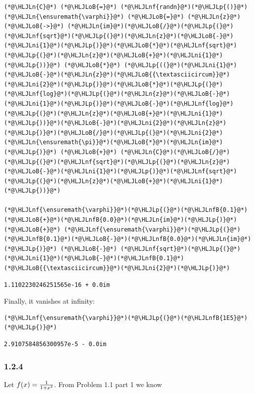 \documentclass[12pt,a4paper]{article}
\newcommand{\HLJLn}[1]{#1}
\newcommand{\HLJLnf}[1]{\textcolor[RGB]{66,102,213}{#1}}
\newcommand{\HLJLnfB}[1]{\textcolor[RGB]{59,151,46}{#1}}
\newcommand{\HLJLni}[1]{\textcolor[RGB]{59,151,46}{#1}}
\newcommand{\HLJLoB}[1]{\textcolor[RGB]{102,102,102}{\textbf{#1}}}
\newcommand{\HLJLp}[1]{#1}
\begin{document}
\begin{lstlisting}
(*@\HLJLn{C}@*) (*@\HLJLoB{=}@*) (*@\HLJLnf{randn}@*)(*@\HLJLp{()}@*)
(*@\HLJLn{\ensuremath{\varphi}}@*) (*@\HLJLoB{=}@*) (*@\HLJLn{z}@*) (*@\HLJLoB{->}@*) (*@\HLJLn{im}@*)(*@\HLJLoB{/}@*)(*@\HLJLp{(}@*)(*@\HLJLnf{sqrt}@*)(*@\HLJLp{(}@*)(*@\HLJLn{z}@*)(*@\HLJLoB{-}@*)(*@\HLJLni{1}@*)(*@\HLJLp{)}@*)(*@\HLJLoB{*}@*)(*@\HLJLnf{sqrt}@*)(*@\HLJLp{(}@*)(*@\HLJLn{z}@*)(*@\HLJLoB{+}@*)(*@\HLJLni{1}@*)(*@\HLJLp{))}@*) (*@\HLJLoB{*}@*) (*@\HLJLp{((}@*)(*@\HLJLni{1}@*)(*@\HLJLoB{-}@*)(*@\HLJLn{z}@*)(*@\HLJLoB{{\textasciicircum}}@*)(*@\HLJLni{2}@*)(*@\HLJLp{)}@*)(*@\HLJLoB{*}@*)(*@\HLJLp{(}@*)(*@\HLJLnf{log}@*)(*@\HLJLp{(}@*)(*@\HLJLn{z}@*)(*@\HLJLoB{-}@*)(*@\HLJLni{1}@*)(*@\HLJLp{)}@*)(*@\HLJLoB{-}@*)(*@\HLJLnf{log}@*)(*@\HLJLp{(}@*)(*@\HLJLn{z}@*)(*@\HLJLoB{+}@*)(*@\HLJLni{1}@*)(*@\HLJLp{))}@*)(*@\HLJLoB{-}@*)(*@\HLJLni{2}@*)(*@\HLJLn{z}@*)(*@\HLJLp{)}@*)(*@\HLJLoB{/}@*)(*@\HLJLp{(}@*)(*@\HLJLni{2}@*)(*@\HLJLn{\ensuremath{\pi}}@*)(*@\HLJLoB{*}@*)(*@\HLJLn{im}@*)(*@\HLJLp{)}@*) (*@\HLJLoB{+}@*) (*@\HLJLn{C}@*)(*@\HLJLoB{/}@*)(*@\HLJLp{(}@*)(*@\HLJLnf{sqrt}@*)(*@\HLJLp{(}@*)(*@\HLJLn{z}@*)(*@\HLJLoB{-}@*)(*@\HLJLni{1}@*)(*@\HLJLp{)}@*)(*@\HLJLnf{sqrt}@*)(*@\HLJLp{(}@*)(*@\HLJLn{z}@*)(*@\HLJLoB{+}@*)(*@\HLJLni{1}@*)(*@\HLJLp{))}@*)

(*@\HLJLnf{\ensuremath{\varphi}}@*)(*@\HLJLp{(}@*)(*@\HLJLnfB{0.1}@*)(*@\HLJLoB{+}@*)(*@\HLJLnfB{0.0}@*)(*@\HLJLn{im}@*)(*@\HLJLp{)}@*) (*@\HLJLoB{+}@*) (*@\HLJLnf{\ensuremath{\varphi}}@*)(*@\HLJLp{(}@*)(*@\HLJLnfB{0.1}@*)(*@\HLJLoB{-}@*)(*@\HLJLnfB{0.0}@*)(*@\HLJLn{im}@*)(*@\HLJLp{)}@*) (*@\HLJLoB{-}@*) (*@\HLJLnf{sqrt}@*)(*@\HLJLp{(}@*)(*@\HLJLni{1}@*)(*@\HLJLoB{-}@*)(*@\HLJLnfB{0.1}@*)(*@\HLJLoB{{\textasciicircum}}@*)(*@\HLJLni{2}@*)(*@\HLJLp{)}@*)
\end{lstlisting}

\begin{lstlisting}
1.1102230246251565e-16 + 0.0im
\end{lstlisting}


Finally, it vanishes at infinity:


\begin{lstlisting}
(*@\HLJLnf{\ensuremath{\varphi}}@*)(*@\HLJLp{(}@*)(*@\HLJLnfB{1E5}@*)(*@\HLJLp{)}@*)
\end{lstlisting}

\begin{lstlisting}
2.9107584856300957e-5 - 0.0im
\end{lstlisting}


\subsubsection{1.2.4}
Let $f(x) = {1 \over 1+x^2}$. From Problem 1.1 part 1 we know 
\end{document}
